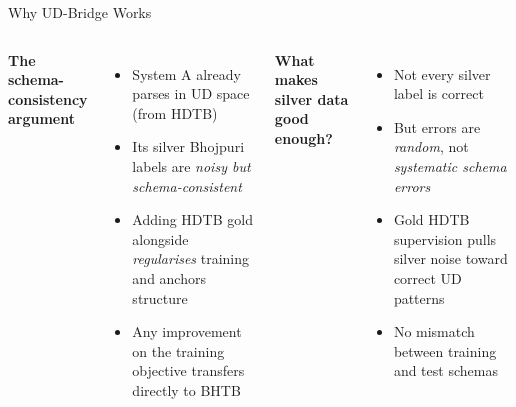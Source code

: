 \documentclass[aspectratio=169,10pt]{beamer}
\newcommand{\bho}{Bhojpuri}
\begin{document}
\begin{frame}{Why UD-Bridge Works}
\begin{columns}[T]
\textbf{The schema-consistency argument}
\begin{itemize}
  \item System A already parses in UD space (from HDTB)
  \item Its silver \bho{} labels are \emph{noisy but schema-consistent}
  \item Adding HDTB gold alongside \emph{regularises} training and anchors structure
  \item Any improvement on the training objective transfers directly to BHTB
\end{itemize}

\textbf{What makes silver data good enough?}
\begin{itemize}
  \item Not every silver label is correct
  \item But errors are \emph{random}, not \emph{systematic schema errors}
  \item Gold HDTB supervision pulls silver noise toward correct UD patterns
  \item No mismatch between training and test schemas
\end{itemize}
\end{columns}

\vspace{0.7cm}
\begin{center}
\end{center}
\end{frame}
\end{document}
